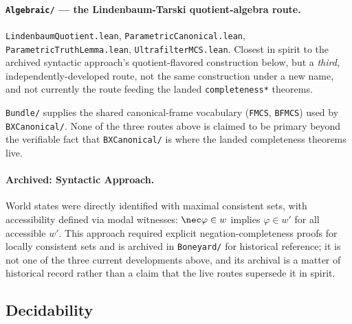 \documentclass[../BimodalReference.tex]{subfiles}
\begin{document}
\paragraph{\texttt{Algebraic/} --- the Lindenbaum-Tarski quotient-algebra route.}
\texttt{LindenbaumQuotient.lean}, \texttt{ParametricCanonical.lean}, \texttt{ParametricTruthLemma.lean}, \texttt{UltrafilterMCS.lean}.
Closest in spirit to the archived syntactic approach's quotient-flavored construction below, but a \emph{third}, independently-developed route, not the same construction under a new name, and not currently the route feeding the landed \texttt{completeness*} theorems.

\texttt{Bundle/} supplies the shared canonical-frame vocabulary (\texttt{FMCS}, \texttt{BFMCS}) used by \texttt{BXCanonical/}.
None of the three routes above is claimed to be primary beyond the verifiable fact that \texttt{BXCanonical/} is where the landed completeness theorems live.


\paragraph{Archived: Syntactic Approach.}
World states were directly identified with maximal consistent sets, with accessibility defined via modal witnesses: $\nec\varphi \in w$ implies $\varphi \in w'$ for all accessible $w'$.
This approach required explicit negation-completeness proofs for locally consistent sets and is archived in \texttt{Boneyard/} for historical reference; it is not one of the three current developments above, and its archival is a matter of historical record rather than a claim that the live routes supersede it in spirit.

\subsection{Decidability}
\end{document}
